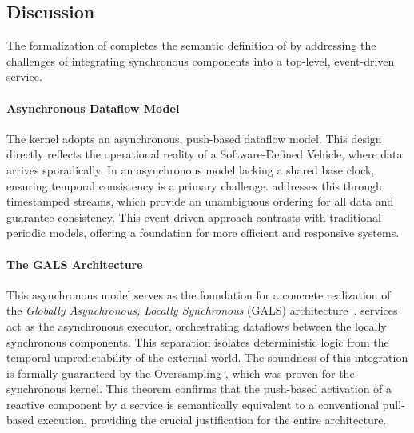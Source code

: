 









\subsection{Discussion}
\label{sec:grfrp:discussion}

The formalization of \GRFRP completes the semantic definition of \GRust by addressing the challenges
of integrating synchronous components into a top-level, event-driven service.

\paragraph{Asynchronous Dataflow Model}
The \GRFRP kernel adopts an asynchronous, push-based dataflow model. This design directly reflects
the operational reality of a Software-Defined Vehicle, where data arrives sporadically. In an
asynchronous model lacking a shared base clock, ensuring temporal consistency is a primary
challenge. \GRFRP addresses this through timestamped streams, which provide an unambiguous
ordering for all data and guarantee consistency. This event-driven approach contrasts with
traditional periodic models, offering a foundation for more efficient and responsive systems.

\paragraph{The GALS Architecture}
This asynchronous model serves as the foundation for a concrete realization of the \emph{Globally
    Asynchronous, Locally Synchronous} (GALS) architecture~\cite{DBLP:phd/us/Chapiro85}. \GRFRP
services act as the asynchronous executor, orchestrating dataflows between the locally synchronous
\GRSync components. This separation isolates deterministic logic from the temporal unpredictability
of the external world. The soundness of this integration is formally guaranteed by the Oversampling
, which was proven for the synchronous kernel. This
theorem confirms that the push-based activation of a reactive component by a \GRFRP service is
semantically equivalent to a conventional pull-based execution, providing the crucial justification
for the entire architecture.

